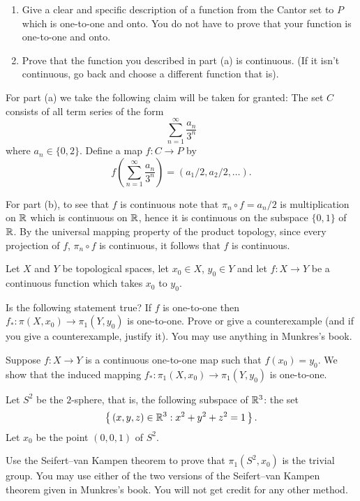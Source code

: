 \begin{problem}
  \hfill
  \begin{enumerate}[label=(\alph*),noitemsep]
  \item Give a clear and specific description of a function from the Cantor
    set to $P$ which is one-to-one and onto. You do not have to prove that
    your function is one-to-one and onto.
  \item Prove that the function you described in part (a) is
    continuous. (If it isn't continuous, go back and choose a different
    function that is).
  \end{enumerate}
\end{problem}
\begin{solution}
  For part (a) we take the following claim will be taken for granted: The
  set $C$ consists of all term series of the form
  \[
    \sum_{n=1}^\infty\frac{a_n}{3^n}
  \]
  where $a_n\in\{0,2\}$. Define a map $f\colon C\to P$ by
  \[
    f\left(\sum_{n=1}^\infty\frac{a_n}{3^n}\right)=(a_1/2,a_2/2,\ldots).
  \]

  For part (b), to see that $f$ is continuous note that
  $\pi_n\circ f=a_n/2$ is multiplication on $\mathbb{R}$ which is continuous on
  $\mathbb{R}$, hence it is continuous on the subspace $\{0,1\}$ of $\mathbb{R}$. By
  the universal mapping property of the product topology, since every
  projection of $f$, $\pi_n\circ f$ is continuous, it follows that $f$ is
  continuous.
\end{solution}

\begin{problem}
  Let $X$ and $Y$ be topological spaces, let $x_0\in X$, $y_0\in Y$ and let
  $f\colon X\to Y$ be a continuous function which takes $x_0$ to $y_0$.

  Is the following statement true? If $f$ is one-to-one then
  $f_*\colon\pi(X,x_0)\to \pi_1(Y,y_0)$ is one-to-one. Prove or give a
  counterexample (and if you give a counterexample, justify it). You may
  use anything in Munkres's book.
\end{problem}
\begin{solution}
  Suppose $f\colon X\to Y$ is a continuous one-to-one map such that
  $f(x_0)=y_0$. We show that the induced mapping $f_*\colon
  \pi_1(X,x_0)\to\pi_1(Y,y_0)$ is one-to-one.
\end{solution}

\begin{problem}
  Let $S^2$ be the $2$-sphere, that is, the following subspace of $\mathbb{R}^3$:
  the set
  \[
    \left\{\,(x,y,z)\in\mathbb{R}^3:x^2+y^2+z^2=1\,\right\}.
  \]
  Let $x_0$ be the point $(0,0,1)$ of $S^2$.


  Use the Seifert--van Kampen theorem to prove that $\pi_1(S^2,x_0)$ is the
  trivial group. You may use either of the two versions of the Seifert--van
  Kampen theorem given in Munkres's book. You will not get credit for any
  other method.
\end{problem}

\begin{solution}
\end{solution}

